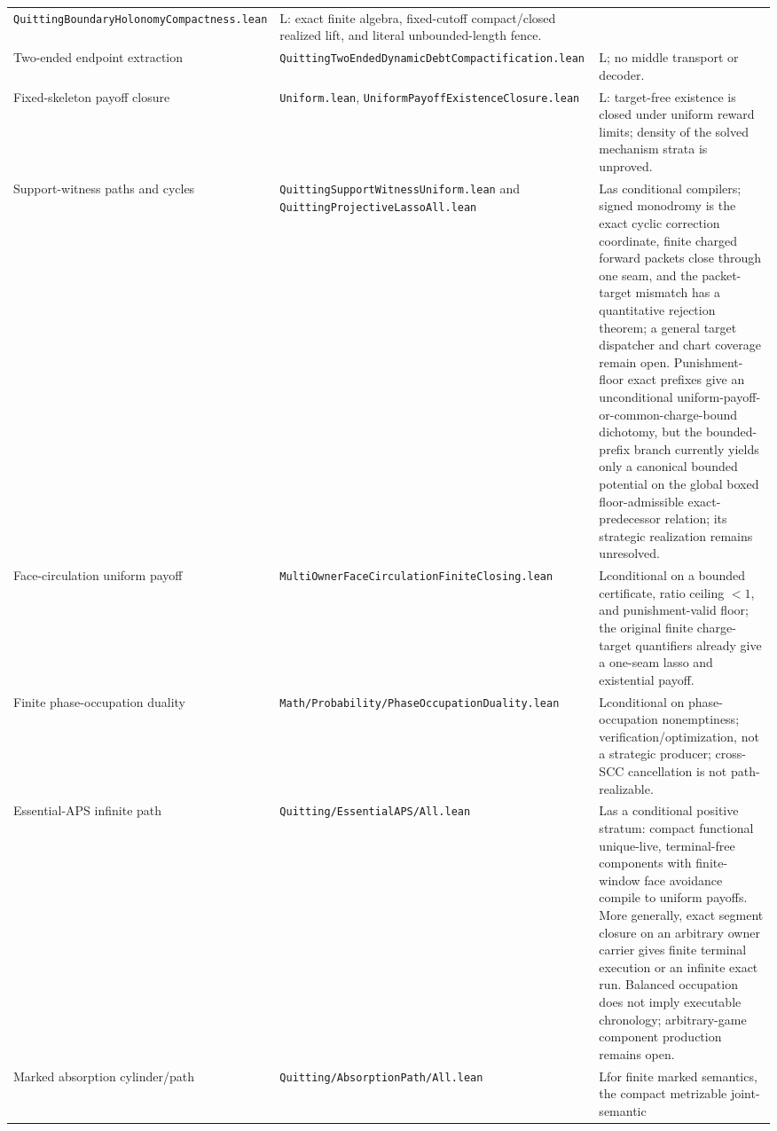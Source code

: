 \documentclass[11pt]{article}
\newcommand{\LTag}{\textsf{L}}
\newcommand{\Prod}{\LTag}
\begin{document}
\begin{longtable}{@{}p{}p{}p{}@{}}
\texttt{QuittingBoundaryHolonomyCompactness.lean} &
\Prod: exact finite algebra, fixed-cutoff compact/closed realized lift, and
literal unbounded-length fence.\\
Two-ended endpoint extraction &
\texttt{QuittingTwoEndedDynamicDebtCompactification.lean} &
\Prod; no middle transport or decoder.\\
Fixed-skeleton payoff closure &
\texttt{Uniform.lean}, \texttt{UniformPayoffExistenceClosure.lean} &
\Prod: target-free existence is closed under uniform reward limits; density of
the solved mechanism strata is unproved.\\
Support-witness paths and cycles &
\texttt{QuittingSupportWitnessUniform.lean} and
\texttt{QuittingProjectiveLassoAll.lean} &
\Prod as conditional compilers; signed monodromy is the exact cyclic correction
coordinate, finite charged forward packets close through one seam, and the
packet-target mismatch has a quantitative rejection theorem; a general target
dispatcher and chart coverage remain open.  Punishment-floor exact prefixes
give an unconditional uniform-payoff-or-common-charge-bound dichotomy, but the
bounded-prefix branch currently yields only a canonical bounded potential on
the global boxed floor-admissible exact-predecessor relation; its strategic
realization remains unresolved.\\
Face-circulation uniform payoff &
\texttt{MultiOwnerFace\-CirculationFinite\-Closing.lean} &
\Prod conditional on a bounded certificate, ratio ceiling \(<1\), and
punishment-valid floor; the original finite charge-target quantifiers already
give a one-seam lasso and existential payoff.\\
Finite phase-occupation duality &
\texttt{Math/Probability/PhaseOccupationDuality.lean} &
\Prod conditional on phase-occupation nonemptiness; verification/optimization,
not a strategic producer; cross-SCC cancellation is not path-realizable.\\
Essential-APS infinite path &
\texttt{Quitting/EssentialAPS/All.lean} &
\Prod as a conditional positive stratum: compact functional unique-live,
terminal-free components with finite-window face avoidance compile to uniform
payoffs.  More generally, exact segment closure on an arbitrary owner carrier
gives finite terminal execution or an infinite exact run.  Balanced occupation
does not imply executable chronology; arbitrary-game component production
remains open.\\
Marked absorption cylinder/path &
\texttt{Quitting/AbsorptionPath/All.lean} &
\Prod for finite marked semantics, the compact metrizable joint-semantic

\end{longtable}
\end{document}
